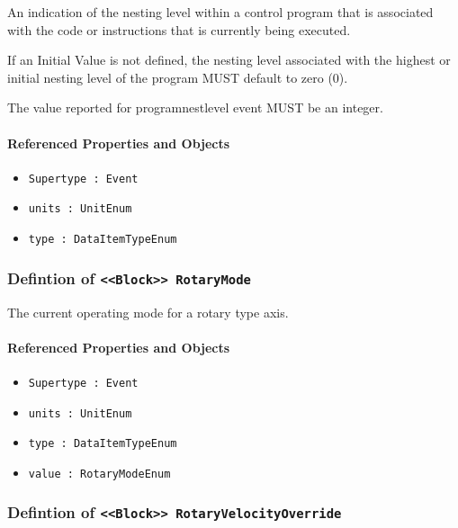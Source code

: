 \FloatBarrier

An indication of the nesting level within a control program that is associated with the code or instructions that is currently being executed.
  
 If an Initial Value is not defined, the nesting level associated with the highest or initial nesting level of the program MUST default to zero (0).
  
 The value reported for programnestlevel event MUST be an integer.

\FloatBarrier
\paragraph{Referenced Properties and Objects}

\begin{itemize}
\item \texttt{Supertype : Event}

\item \texttt{units : UnitEnum}

\item \texttt{type : DataItemTypeEnum}

\end{itemize}
\FloatBarrier
\subsubsection{Defintion of \texttt{<<Block>> RotaryMode}}
  \label{type:RotaryMode}

\FloatBarrier

The current operating mode for a rotary type axis.

\FloatBarrier
\paragraph{Referenced Properties and Objects}

\begin{itemize}
\item \texttt{Supertype : Event}

\item \texttt{units : UnitEnum}

\item \texttt{type : DataItemTypeEnum}

\item \texttt{value : RotaryModeEnum}

\end{itemize}
\FloatBarrier
\subsubsection{Defintion of \texttt{<<Block>> RotaryVelocityOverride}}
  \label{type:RotaryVelocityOverride}

